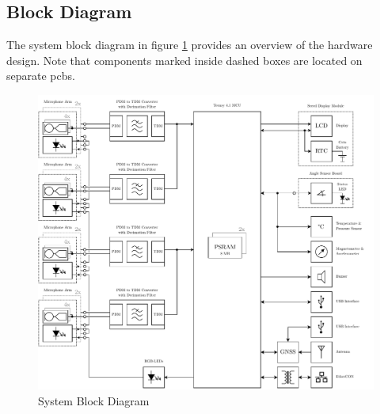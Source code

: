 \subsection{Block Diagram}
The system block diagram in figure \ref{fig:system_block_diagram} provides an overview of the hardware design.
Note that components marked inside dashed boxes are located on separate \acrshort{pcb}s.
\begin{figure}[h!]
	\hspace{-1.3cm}
	\includegraphics[width=1.28\textwidth, angle=90]{images/6_design_final/final_design_block_diagram.pdf}
	\vspace{-0.1cm}
	\caption{System Block Diagram}
	\label{fig:system_block_diagram}
\end{figure}
\newpage

